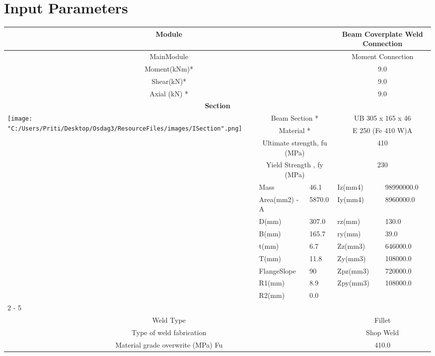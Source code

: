 \documentclass{article}%
\begin{document}
%
\normalsize%
\pagestyle{header}%
\section{Input Parameters}%
\label{sec:InputParameters}%
\renewcommand{\arraystretch}{1.2}%
\begin{longtable}{|p{5cm}|p{2cm}|p{2cm}|p{2cm}|p{5cm}|}%
\hline%
\hline%
\multicolumn{3}{|c|}{Module}&\multicolumn{2}{|c|}{Beam Coverplate  Weld Connection}\\%
\hline%
\hline%
\multicolumn{3}{|c|}{MainModule}&\multicolumn{2}{|c|}{Moment Connection}\\%
\hline%
\hline%
\multicolumn{3}{|c|}{Moment(kNm)*}&\multicolumn{2}{|c|}{9.0}\\%
\hline%
\hline%
\multicolumn{3}{|c|}{Shear(kN)*}&\multicolumn{2}{|c|}{9.0}\\%
\hline%
\hline%
\multicolumn{3}{|c|}{Axial (kN) *}&\multicolumn{2}{|c|}{9.0}\\%
\hline%
\hline%
\multicolumn{5}{|c|}{\textbf{Section}}\\%
\hline%
\hline%
\multirow{13}{*}{\texttt{[image: "C:/Users/Priti/Desktop/Osdag3/ResourceFiles/images/ISection".png]}}&\multicolumn{2}{|c|}{Beam Section *}&\multicolumn{2}{|c|}{UB 305 x 165 x 46}\\%
\cline{2%
-%
5}%
&\multicolumn{2}{|c|}{Material *}&\multicolumn{2}{|c|}{E 250 (Fe 410 W)A}\\%
\cline{2%
-%
5}%
&\multicolumn{2}{|c|}{Ultimate strength, fu (MPa)}&\multicolumn{2}{|c|}{410}\\%
\cline{2%
-%
5}%
&\multicolumn{2}{|c|}{Yield Strength , fy (MPa)}&\multicolumn{2}{|c|}{230}\\%
\cline{2%
-%
5}%
&Mass&46.1&Iz(mm4)&98990000.0\\%
\cline{2%
-%
5}%
&Area(mm2) {-} A&5870.0&Iy(mm4)&8960000.0\\%
\cline{2%
-%
5}%
&D(mm)&307.0&rz(mm)&130.0\\%
\cline{2%
-%
5}%
&B(mm)&165.7&ry(mm)&39.0\\%
\cline{2%
-%
5}%
&t(mm)&6.7&Zz(mm3)&646000.0\\%
\cline{2%
-%
5}%
&T(mm)&11.8&Zy(mm3)&108000.0\\%
\cline{2%
-%
5}%
&FlangeSlope&90&Zpz(mm3)&720000.0\\%
\cline{2%
-%
5}%
&R1(mm)&8.9&Zpy(mm3)&108000.0\\%
\cline{2%
-%
5}%
&R2(mm)&0.0&&\\%
\cline{2%
-%
5}%
\hline%
\multicolumn{5}{|c|}{\textbf{Weld Details}}\\%
\hline%
\hline%
\multicolumn{3}{|c|}{Weld Type}&\multicolumn{2}{|c|}{Fillet}\\%
\hline%
\hline%
\multicolumn{3}{|c|}{Type of weld fabrication}&\multicolumn{2}{|c|}{Shop Weld}\\%
\hline%
\hline%
\multicolumn{3}{|c|}{Material grade overwrite (MPa) Fu}&\multicolumn{2}{|c|}{410.0}\\%
\hline%
\end{longtable}
\end{document}
